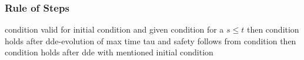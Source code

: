 \documentclass[10pt]{article}
\begin{document}
\begin{calculus}
{            }{}
        \end{calculus}

        \subsubsection{Rule of Steps}
            \label{sec:rule-of-steps}

            condition valid for initial condition and given condition for a $s\leq t$ then condition holds after dde-evolution of max time tau and safety follows from condition then condition holds after dde with mentioned initial condition

            \begin{calculus}
            \end{calculus}
\end{document}
